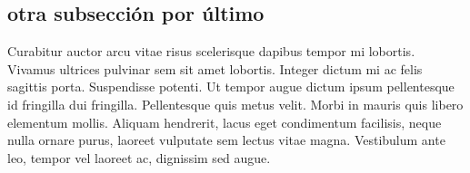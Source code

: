 \documentclass[a4paper,10pt]{article}
\begin{document}
\begin{multicols}{3}
\subsection{otra subsección por último}
Curabitur auctor arcu vitae risus scelerisque dapibus tempor mi lobortis. Vivamus ultrices pulvinar sem sit amet lobortis. Integer dictum 
mi 
ac felis sagittis porta. Suspendisse potenti. Ut tempor augue dictum ipsum pellentesque id fringilla dui fringilla. Pellentesque quis 
metus 
velit. Morbi in mauris quis libero elementum mollis. Aliquam hendrerit, lacus eget condimentum facilisis, neque nulla ornare purus, 
laoreet 
vulputate sem lectus vitae magna. Vestibulum ante leo, tempor vel laoreet ac, dignissim sed augue.


\end{multicols}
\end{document}
